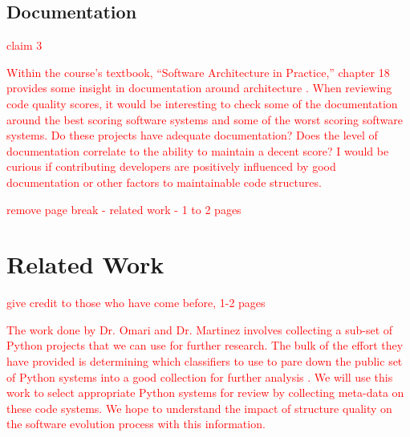\documentclass[12pt,conference]{IEEEtran}
\newcommand\todo[1]{\textcolor{red}{#1}}
\begin{document}
\subsection{Documentation}


\todo{claim 3}

\todo{Within the course's textbook, ``Software Architecture in Practice,'' chapter 18 provides some insight in documentation around architecture \cite{book:software-architecture-in-practice}. When reviewing code quality scores, it would be interesting to check some of the documentation around the best scoring software systems and some of the worst scoring software systems. Do these projects have adequate documentation? Does the level of documentation correlate to the ability to maintain a decent score? I would be curious if contributing developers are positively influenced by good documentation or other factors to maintainable code structures.}

\newpage \todo{remove page break - related work - 1 to 2 pages}

\section{Related Work}

\todo{give credit to those who have come before, 1-2 pages}

\todo{The work done by Dr. Omari and Dr. Martinez involves collecting a sub-set of Python projects that we can use for further research. The bulk of the effort they have provided is determining which classifiers to use to pare down the public set of Python systems into a good collection for further analysis \cite{omari:2018}. We will use this work to select appropriate Python systems for review by collecting meta-data on these code systems. We hope to understand the impact of structure quality on the software evolution process with this information.}
\end{document}
